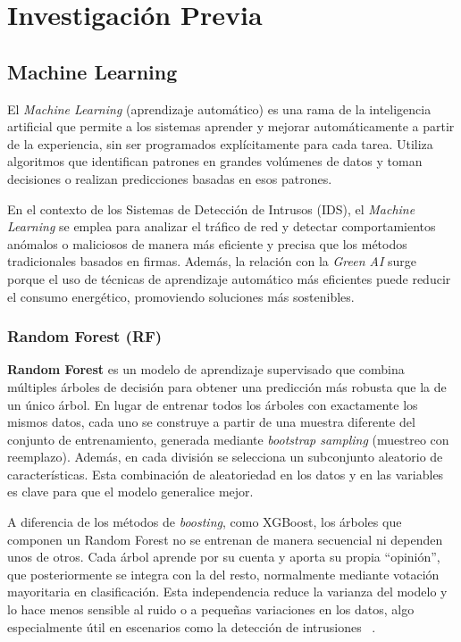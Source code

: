 \chapter{Investigación Previa}

\section{Machine Learning}

El \textit{Machine Learning} (aprendizaje automático) es una rama de la inteligencia artificial que permite a los sistemas aprender y mejorar automáticamente a partir de la experiencia, sin ser programados explícitamente para cada tarea. Utiliza algoritmos que identifican patrones en grandes volúmenes de datos y toman decisiones o realizan predicciones basadas en esos patrones.

En el contexto de los Sistemas de Detección de Intrusos (IDS), el \textit{Machine Learning} se emplea para analizar el tráfico de red y detectar comportamientos anómalos o maliciosos de manera más eficiente y precisa que los métodos tradicionales basados en firmas. Además, la relación con la \textit{Green AI} surge porque el uso de técnicas de aprendizaje automático más eficientes puede reducir el consumo energético, promoviendo soluciones más sostenibles.

\subsection{Random Forest (RF)}

\textbf{Random Forest} es un modelo de aprendizaje supervisado que combina múltiples árboles de decisión para obtener una predicción más robusta que la de un único árbol. En lugar de entrenar todos los árboles con exactamente los mismos datos, cada uno se construye a partir de una muestra diferente del conjunto de entrenamiento, generada mediante \textit{bootstrap sampling} (muestreo con reemplazo). Además, en cada división se selecciona un subconjunto aleatorio de características. Esta combinación de aleatoriedad en los datos y en las variables es clave para que el modelo generalice mejor.

A diferencia de los métodos de \textit{boosting}, como XGBoost, los árboles que componen un Random Forest no se entrenan de manera secuencial ni dependen unos de otros. Cada árbol aprende por su cuenta y aporta su propia “opinión”, que posteriormente se integra con la del resto, normalmente mediante votación mayoritaria en clasificación. Esta independencia reduce la varianza del modelo y lo hace menos sensible al ruido o a pequeñas variaciones en los datos, algo especialmente útil en escenarios como la detección de intrusiones ~\cite{rf_xgboost}.

